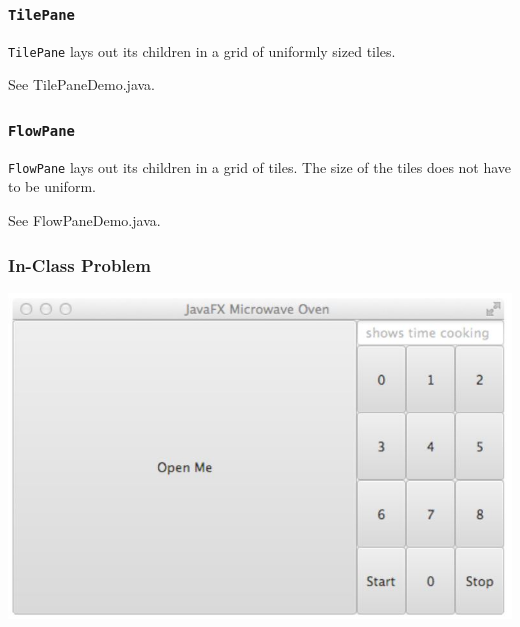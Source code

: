\documentclass{beamer}
\newcommand{\mil}[1]{\texttt{#1}}
\begin{document}
\begin{frame}
    
    \frametitle{\mil{TilePane}}

    \mil{TilePane} lays out its children in a grid of uniformly sized tiles.
    
    \bigskip
    
    See TilePaneDemo.java.
        
\end{frame}

\begin{frame}
    
    \frametitle{\mil{FlowPane}}

    \mil{FlowPane} lays out its children in a grid of tiles.  The size of the tiles does not have to be uniform.
    
    \bigskip
    
    See FlowPaneDemo.java.
        
\end{frame}

\begin{frame}
    \frametitle{In-Class Problem}
    
        \begin{center}
    \includegraphics[scale=0.4]{microwave_oven.jpg}
    \end{center}
    
\end{frame}
\end{document}
